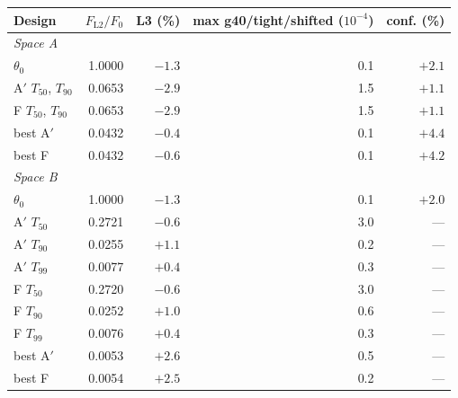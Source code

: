 \begin{tabular}{lrrrr}\toprule
Design & $F_{\mathrm{L2}}/F_0$ & L3 (\%) & max g40/tight/shifted ($10^{-4}$) & conf. (\%)\\\midrule
\multicolumn{5}{l}{\emph{Space A}}\\
$\theta_0$ & 1.0000 & $-1.3$ & 0.1 & $+2.1$ \\
A$'$ $T_{50}$, $T_{90}$ & 0.0653 & $-2.9$ & 1.5 & $+1.1$ \\
F $T_{50}$, $T_{90}$ & 0.0653 & $-2.9$ & 1.5 & $+1.1$ \\
best A$'$ & 0.0432 & $-0.4$ & 0.1 & $+4.4$ \\
best F & 0.0432 & $-0.6$ & 0.1 & $+4.2$ \\
\multicolumn{5}{l}{\emph{Space B}}\\
$\theta_0$ & 1.0000 & $-1.3$ & 0.1 & $+2.0$ \\
A$'$ $T_{50}$ & 0.2721 & $-0.6$ & 3.0 & --- \\
A$'$ $T_{90}$ & 0.0255 & $+1.1$ & 0.2 & --- \\
A$'$ $T_{99}$ & 0.0077 & $+0.4$ & 0.3 & --- \\
F $T_{50}$ & 0.2720 & $-0.6$ & 3.0 & --- \\
F $T_{90}$ & 0.0252 & $+1.0$ & 0.6 & --- \\
F $T_{99}$ & 0.0076 & $+0.4$ & 0.3 & --- \\
best A$'$ & 0.0053 & $+2.6$ & 0.5 & --- \\
best F & 0.0054 & $+2.5$ & 0.2 & --- \\
\bottomrule\end{tabular}
